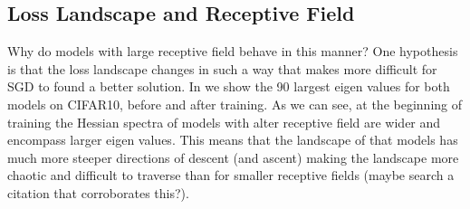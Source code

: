 \subsection{Loss Landscape and Receptive Field}
Why do models with large receptive field behave in this manner? One hypothesis is that the loss landscape changes in
such a way that makes more difficult for SGD to found a better solution. In  we show the 90 largest eigen values for both models on CIFAR10, before and after training. As
we can see, at the beginning of training the Hessian spectra of models with alter receptive field are wider and
encompass larger eigen values. This means that the landscape of that models has much more steeper directions of descent
(and ascent) making the landscape more chaotic  and difficult to traverse than for smaller receptive fields (maybe search
a citation that corroborates this?).




